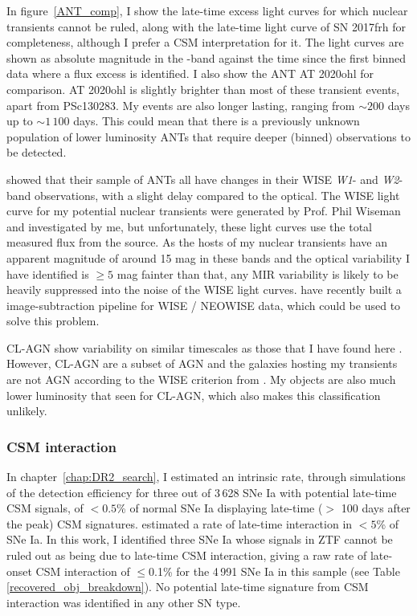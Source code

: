 \documentclass[a4paper,oneside,12pt, class=Latex/Classes/PhDthesisPSnPDF, crop=false]{standalone}
\begin{document}
In figure~\ref{ANT_comp}, I show the late-time excess light curves for which nuclear transients cannot be ruled, along with the late-time light curve of SN 2017frh for completeness, although I prefer a CSM interpretation for it. The light curves are shown as absolute magnitude in the \ztfr-band against the time since the first binned data where a flux excess is identified. I also show the ANT AT 2020ohl \citep{2020ohl_Hinkle} for comparison. AT 2020ohl is slightly brighter than most of these transient events, apart from PSc130283. My events are also longer lasting, ranging from $\sim200$ days up to $\sim1\,100$ days. This could mean that there is a previously unknown population of lower luminosity ANTs that require deeper (binned) observations to be detected.

\citet{wiseman_ztfants} showed that their sample of ANTs all have changes in their WISE \textit{W1}- and \textit{W2}-band observations, with a slight delay compared to the optical. The WISE light curve for my potential nuclear transients were generated by Prof. Phil Wiseman and investigated by me, but unfortunately, these light curves use the total measured flux from the source. As the hosts of my nuclear transients have an apparent magnitude of around 15 mag in these bands and the optical variability I have identified is $\geq5$ mag fainter than that, any MIR variability is likely to be heavily suppressed into the noise of the WISE light curves. \citet{WISE_diff_im} have recently built a image-subtraction pipeline for WISE / NEOWISE data, which could be used to solve this problem.

CL-AGN show variability on similar timescales as those that I have found here \citep{CLAGN}. However, CL-AGN are a subset of AGN and the galaxies hosting my transients are not AGN according to the WISE criterion from \citet{WISE_crit}. My objects are also much lower luminosity that seen for CL-AGN, which also makes this classification unlikely.


\subsubsection{CSM interaction}
In chapter~\ref{chap:DR2_search}, I estimated an intrinsic rate, through simulations of the detection efficiency for three out of 3\,628 SNe Ia with potential late-time CSM signals, of $<0.5$\% of normal SNe Ia displaying late-time ($>$ 100 days after the peak) CSM signatures. \cite{GALEX_Late_CSM} estimated a rate of late-time interaction in $<5$\% of SNe Ia. In this work, I identified three SNe Ia whose signals in ZTF cannot be ruled out as being due to late-time CSM interaction, giving a raw rate of late-onset CSM interaction of $\leq$0.1\% for the \color{red} 4\,991 \color{black} SNe Ia in this sample (see Table \ref{recovered_obj_breakdown}). No potential late-time signature from CSM interaction was identified in any other SN type.\\
\end{document}
